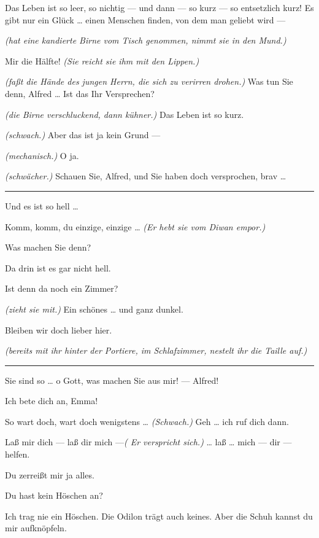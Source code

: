 \documentclass[
	final,
	a4paper,
	ngerman,
	mpinclude = true, %
	twoside = true,
	open = right,
	cleardoublepage = plain,
	DIV = 13,
	BCOR = 1cm,
	titlepage = firstiscover,
	]{scrbook}
\newcommand{\direction}[1]{\textit{(#1)}}
\newenvironment{deletion}{%
		\vspace{0.25\baselineskip}
		\hrule
		\vspace{0.25\baselineskip}
		\color{darkgray}
	}{
		\color{black}
		\vspace{0.25\baselineskip}
		\hrule 
		\vspace{0.25\baselineskip}
	}
\newcommand{\thecharacter}[1]{\textup{\textsc{#1}}\xspace}
\newcommand{\theherr}{\thecharacter{Junger Herr}}
\newcommand{\thefrau}{\thecharacter{Junge Frau}}
\newcommand{\character}[1]{\item[#1:]}
\newcommand{\herr}{\character{\theherr}}
\newcommand{\frau}{\character{\thefrau}}
\begin{document}
\begin{play}
	\herr
	Das Leben ist so leer, so nichtig --- und dann --- so kurz --- so entsetzlich kurz! Es gibt nur ein Glück \ldots{} einen Menschen finden, von dem man geliebt wird ---

	\frau
	\direction{hat eine kandierte Birne vom Tisch genommen, nimmt sie in den Mund.}

	\herr
	Mir die Hälfte! \direction{Sie reicht sie ihm mit den Lippen.}

	\frau
	\direction{faßt die Hände des jungen Herrn, die sich zu verirren drohen.} Was tun Sie denn, Alfred \ldots{} Ist das Ihr Versprechen?

	\herr
	\direction{die Birne verschluckend, dann kühner.} Das Leben ist so kurz.

	\frau
	\direction{schwach.} Aber das ist ja kein Grund ---

	\herr
	\direction{mechanisch.} O ja.

	\frau
	\direction{schwächer.} Schauen Sie, Alfred, und Sie haben doch versprochen, brav \ldots{}
	\begin{deletion}
	Und es ist so hell \ldots{}

	\herr
	Komm, komm, du einzige, einzige \ldots{} \direction{Er hebt sie vom Diwan empor.}

	\frau
	Was machen Sie denn?

	\herr
	Da drin ist es gar nicht hell.

	\frau
	Ist denn da noch ein Zimmer?

	\herr
	\direction{zieht sie mit.} Ein schönes \ldots{} und ganz dunkel.

	\frau
	Bleiben wir doch lieber hier.

	\herr
	\direction{bereits mit ihr hinter der Portiere, im Schlafzimmer, nestelt ihr die Taille auf.}

	\frau
	\end{deletion}
	Sie sind so \ldots{} o Gott, was machen Sie aus mir! --- Alfred!

	\herr
	Ich bete dich an, Emma!

	\frau
	So wart doch, wart doch wenigstens \ldots{} \direction{Schwach.} Geh \ldots{} ich ruf dich dann.

	\herr
	Laß mir dich --- laß dir mich ---\direction{ Er verspricht sich.} \ldots{} laß \ldots{} mich --- dir --- helfen.

	\frau
	Du zerreißt mir ja alles.

	\herr
	Du hast kein Höschen an?

	\frau
	Ich trag nie ein Höschen. Die Odilon trägt auch keines. Aber die Schuh kannst du mir aufknöpfeln.


\end{play}
\end{document}
